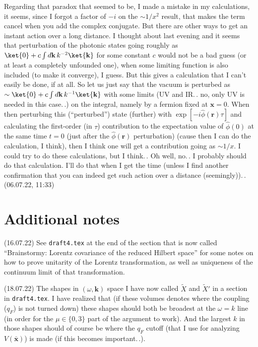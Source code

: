 \documentclass{report}
\begin{document}
Regarding that paradox that seemed to be, I made a mistake in my calculations, it seems, since I forgot a factor of $-i$ on the $\sim 1/x^2$ result, that makes the term cancel when you add the complex conjugate. But there are other ways to get an instant action over a long distance. I thought about last evening and it seems that perturbation of the photonic states going roughly as $\ket{0} + c\int d\mathbf{k}\, k^{-2} \ket{\mathbf{k}}$ for some constant $c$ would not be a bad guess (or at least a completely unfounded one), when some limiting function is also included (to make it converge), I guess. But this gives a calculation that I can't easily be done, if at all. So let us just say that the vacuum is perturbed as $\sim \ket{0} + c\int d\mathbf{k}\, k^{-1} \ket{\mathbf{k}}$ with some limits (UV and IR.\,. no, only UV is needed in this case.\,.) on the integral, namely by a fermion fixed at $\mathbf{x}=0$. When then perturbing this (``perturbed'') state (further) with $\exp[-i\hat\phi(\mathbf{r})\tau]$ and calculating the first-order (in $\tau$) contribution to the expectation value of $\hat \phi(0)$ at the same time $t=0$ (just after the $\hat\phi(\mathbf{r})$ perturbation) (cause then I can do the calculation, I think), then I think one will get a contribution going as $\sim 1/x$. I could try to do these calculations, but I think.\,. Oh well, no.\,. I probably should do that calculation. I'll do that when I get the time (unless I find another confirmation that you can indeed get such action over a distance (seemingly)).\,. (06.07.22, 11:33)


\section{Additional notes}

(16.07.22) See \texttt{draft4.tex} at the end of the section that is now called ``Brainstormy: Lorentz covariance of the reduced Hilbert space'' for some notes on how to prove unitarity of the Lorentz transformation, as well as uniqueness of the continuum limit of that transformation. 


(18.07.22) The shapes in $(\omega, \mathbf{k})$ space I have now called $\widetilde X$ and $\widetilde X'$ in a section in \texttt{draft4.tex}. I have realized that (if these volumes denotes where the coupling ($q_F$) is not turned down) these shapes should both be broadest at the $\omega = k$ line (in order for the $\mu\in\{0,3\}$ part of the argument to work). And the largest $k$ in those shapes should of course be where the $q_F$ cutoff (that I use for analyzing $V(\mathbf{\bar x})$) is made (if this becomes important.\,.). %
\end{document}
